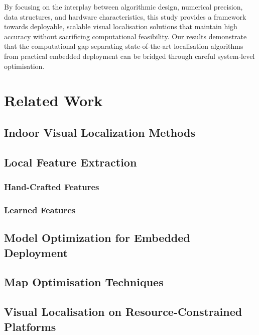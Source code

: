 \documentclass[12pt]{article}
\begin{document}
By focusing on the interplay between algorithmic design, numerical precision, data structures, and hardware characteristics, this study provides a framework towards deployable, scalable visual localisation solutions that maintain high accuracy without sacrificing computational feasibility. Our results demonstrate that the computational gap separating state-of-the-art localisation algorithms from practical embedded deployment can be bridged through careful system-level optimisation.


\newpage
\section{Related Work}


\subsection{Indoor Visual Localization Methods}
\subsection{Local Feature Extraction}

\subsubsection{Hand-Crafted Features}

\subsubsection{Learned Features}

\subsection{Model Optimization for Embedded Deployment}

\subsection{Map Optimisation Techniques}


\subsection{Visual Localisation on Resource-Constrained Platforms}
\newpage
\end{document}
